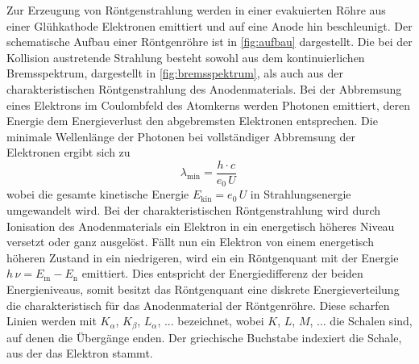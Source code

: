 Zur Erzeugung von Röntgenstrahlung werden in einer evakuierten Röhre aus einer Glühkathode
Elektronen emittiert und auf eine Anode hin beschleunigt.
Der schematische Aufbau einer Röntgenröhre ist in \autoref{fig:aufbau} dargestellt.
Die bei der Kollision austretende Strahlung besteht sowohl aus dem kontinuierlichen 
Bremsspektrum, dargestellt in \autoref{fig:bremsspektrum}, 
als auch aus der charakteristischen Röntgenstrahlung des Anodenmaterials.
Bei der Abbremsung eines Elektrons im Coulombfeld des Atomkerns werden Photonen emittiert, 
deren Energie dem Energieverlust den abgebremsten Elektronen entsprechen.
Die minimale Wellenlänge der Photonen bei vollständiger Abbremsung der Elektronen ergibt sich zu
\begin{equation}
    \lambda_\text{min} = \frac{h \cdot c}{e_0 \, U} \,
\end{equation}
wobei die gesamte kinetische Energie $E_\text{kin} = e_0 \, U$ in Strahlungsenergie umgewandelt wird.
Bei der charakteristischen Röntgenstrahlung wird durch Ionisation des Anodenmaterials ein Elektron in ein energetisch höheres Niveau versetzt oder ganz ausgelöst.
Fällt nun ein Elektron von einem energetisch höheren Zustand in ein niedrigeren, wird ein
ein Röntgenquant mit der Energie $h \, \nu = E_\text{m} - E_\text{n}$ emittiert. 
Dies entspricht der Energiedifferenz der beiden Energieniveaus, 
somit besitzt das Röntgenquant eine diskrete Energieverteilung die charakteristisch für das Anodenmaterial der Röntgenröhre.
Diese scharfen Linien werden mit $K_\alpha$, $K_\beta$, $L_\alpha$, ... bezeichnet, wobei $K$, $L$, $M$, ... die Schalen sind, auf denen die Übergänge enden.
Der griechische Buchstabe indexiert die Schale, aus der das Elektron stammt.

